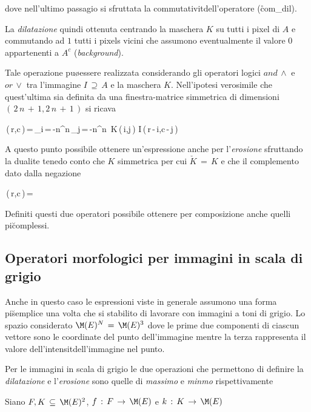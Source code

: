 dove nell'ultimo passagio si \e sfruttata la commutativit\a dell'operatore (\r{com_dil}).

La {\it dilatazione} \e quindi ottenuta centrando la maschera $K$ su tutti i pixel
di $A$ e commutando ad $1$ tutti i pixels vicini che assumono eventualmente il
valore $0$ appartenenti a $A^c$ ({\it background}).

Tale operazione pu\o essere realizzata considerando gli operatori logici $and\,\wedge$ e
$or\,\vee$ tra l'immagine $I\,\supseteq\,A$ e la maschera $K$. Nell'ipotesi verosimile
che quest'ultima sia definita da una finestra-matrice simmetrica di dimensioni 
$(\,2\,n\,+\,1,2\,n\,+\,1\,)$ si ricava

\be
{}\,(\,r,c\,)\,=\,\bigvee_{i\,=\,-n}^{n}\,\bigvee_{j\,=\,-n}^{n}
\,K\,(\,i,j\,)\,\wedge\,I\,(\,r\,-\,i,c\,-\,j\,)
\ee

A questo punto \e possibile ottenere un'espressione anche per l'{\it erosione} sfruttando
la dualit\a e tenedo conto che $K$ \e simmetrica per cui $\check{K}\,=\,K$ e che
il complemento \e dato dalla negazione

\be
{}\,(\,r,c\,)\,=\,
\ee

Definiti questi due operatori \e possibile ottenere per composizione anche quelli
pi\u complessi.

\subsection{Operatori morfologici per immagini in scala di grigio}

Anche in questo caso le espressioni viste in generale assumono una forma pi\u
semplice una volta che si \e stabilito di lavorare con immagini a toni di grigio.
Lo spazio considerato \e $\M(E)^N\,=\,\M(E)^3$ dove le prime due componenti di ciascun
vettore sono le coordinate del punto dell'immagine mentre la terza rappresenta
il valore dell'intensit\a dell'immagine nel punto.

Per le immagini in scala di grigio le due operazioni che permettono di definire
la {\it dilatazione} e l'{\it erosione} sono quelle di {\it massimo} e {\it minmo}
rispettivamente

\bpr

Siano $F,K\,\subseteq\,\M(E)^2$, $f\,:\,F\,\rightarrow\,\M(E)$ e $k\,:\,K\,\rightarrow\,\M(E)$

